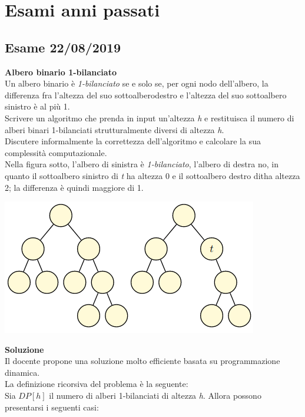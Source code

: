 \documentclass[../cheatSheetAlgoritmi.tex]{subfiles}
\begin{document}
\section{Esami anni passati}
\subsection{Esame 22/08/2019}
\textbf{Albero binario 1-bilanciato} \\
Un albero binario è \emph{1-bilanciato} se e solo se, per ogni nodo dell'albero, la differenza fra l'altezza del suo sottoalberodestro e l'altezza del suo sottoalbero sinistro è al più 1. \\
Scrivere un algoritmo che prenda in input un’altezza \emph{h} e restituisca il numero di alberi binari 1-bilanciati strutturalmente diversi di altezza \emph{h}. \\
Discutere informalmente la correttezza dell’algoritmo e calcolare la sua complessità computazionale. \\
Nella figura sotto, l’albero di sinistra è \emph{1-bilanciato}, l'albero di destra no, in quanto il sottoalbero sinistro di \emph{t} ha altezza 0 e il sottoalbero destro ditha altezza 2; la differenza è quindi maggiore di 1.
\begin{center}
	\includegraphics{../img/esame_22082019}
\end{center}
\textbf{Soluzione}  \\
Il docente propone una soluzione molto efficiente basata su programmazione dinamica. \\
La definizione ricorsiva del problema è la seguente: \\ 
Sia $DP[h]$ il numero di alberi 1-bilanciati di altezza \emph{h}. Allora possono presentarsi i seguenti casi:
\end{document}
